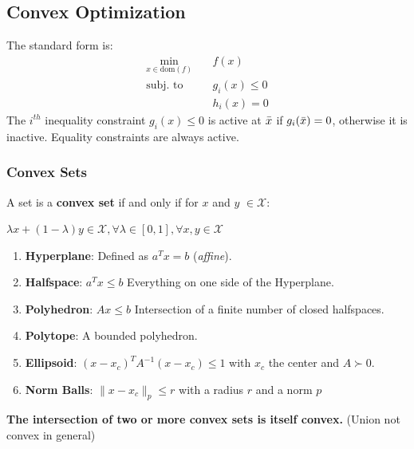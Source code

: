\subsection{Convex Optimization}
The standard form is:
\begin{equation} \label{eq:opt_standard_form}
\begin{aligned}
\min_{x \in \text{dom}(f)} \quad & f(x) \\
\text{subj. to} \quad & g_i(x) \leq 0 \\
& h_i(x) = 0 
\end{aligned}
\end{equation}
The $i^{th}$ inequality constraint $g_i(x) \leq 0$ is active at $\Bar{x}$ if $g_i(\Bar{x}) = 0$, otherwise it is inactive. Equality constraints are always active. 
\subsubsection{Convex Sets}
A set is a \textbf{convex set} if and only if for $x$ and $y$ $\in \mathcal{X}$:
\begin{center}
    $\lambda x + (1-\lambda)y \in \mathcal{X}, \forall \lambda \in [0,1], \forall x, y \in \mathcal{X}$
\end{center}

\begin{enumerate}
    \item \textbf{Hyperplane}: Defined as $a^Tx = b$ (\textit{affine}).
    \item \textbf{Halfspace}: $a^Tx \leq b$ Everything on one side of the Hyperplane.
    \item \textbf{Polyhedron}:  $Ax \leq b$ Intersection of a finite number of closed halfspaces.
    \item \textbf{Polytope}: A bounded polyhedron.
    \item \textbf{Ellipsoid}: $(x-x_c)^TA^{-1}(x-x_c) \leq 1$ with $x_c$ the center and $A \succ 0$.
    \item \textbf{Norm Balls}: $ \| x - x_c \|_p \leq r$ with a radius $r$ and a norm $p$
\end{enumerate}
\textbf{The intersection of two or more convex sets is itself convex.} (Union not convex in general)

